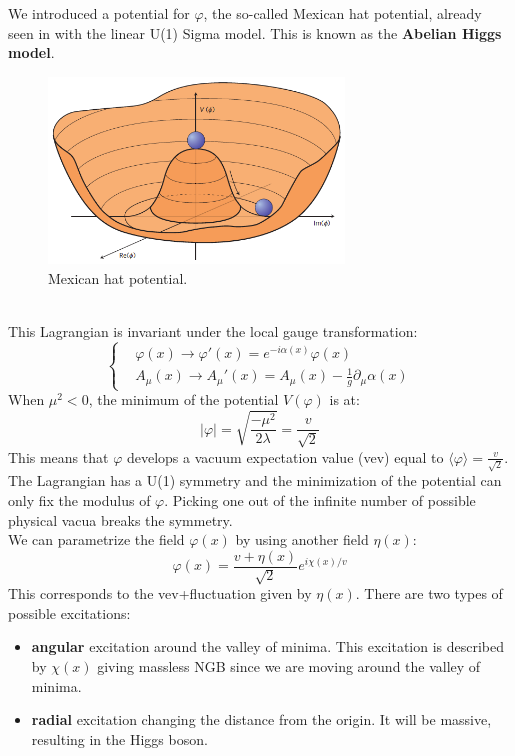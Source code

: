 \documentclass[../main.tex]{subfiles}
\begin{document}
We introduced a potential for $\varphi$, the so-called Mexican hat potential, already seen in  with the linear U(1) Sigma model. This is known as the \textbf{Abelian Higgs model}.
\begin{figure}[h]
    \centering
    \includegraphics[width=0.7\textwidth]{Images/higgspotential.png}
    \caption{Mexican hat potential.}
    \label{fig:my_label}
\end{figure}\\
This Lagrangian is invariant under the local gauge transformation:
\[
\left\{
\begin{aligned}
&\varphi(x)\to\varphi'(x)=e^{-i\alpha(x)}\varphi(x)\\    
&A_\mu(x)\to A_\mu'(x)=A_\mu(x)-\frac{1}{g}\partial_\mu\alpha(x)
\end{aligned}
\right.
\]
When $\mu^2<0$, the minimum of the potential $V(\varphi)$ is at:
\[
|\varphi|=\sqrt{\frac{-\mu^2}{2\lambda}}=\frac{v}{\sqrt{2}}
\]
This means that $\varphi$ develops a vacuum expectation value (vev) equal to $\langle\varphi\rangle=\frac{v}{\sqrt{2}}$. The Lagrangian has a U(1) symmetry and the minimization of the potential can only fix the modulus of $\varphi$. Picking one out of the infinite number of possible physical vacua breaks the symmetry.\\
We can parametrize the field $\varphi(x)$ by using another field $\eta(x)$:
\[
\varphi(x)=\frac{v+\eta(x)}{\sqrt{2}}e^{i\chi(x)/v}
\]
This corresponds to the vev+fluctuation given by $\eta(x)$. There are two types of possible excitations:
\begin{itemize}
    \item \textbf{angular} excitation around the valley of minima. This excitation is described by $\chi(x)$ giving massless NGB since we are moving around the valley of minima.
    \item \textbf{radial} excitation changing the distance from the origin. It will be massive, resulting in the Higgs boson.
\end{itemize}
\end{document}
